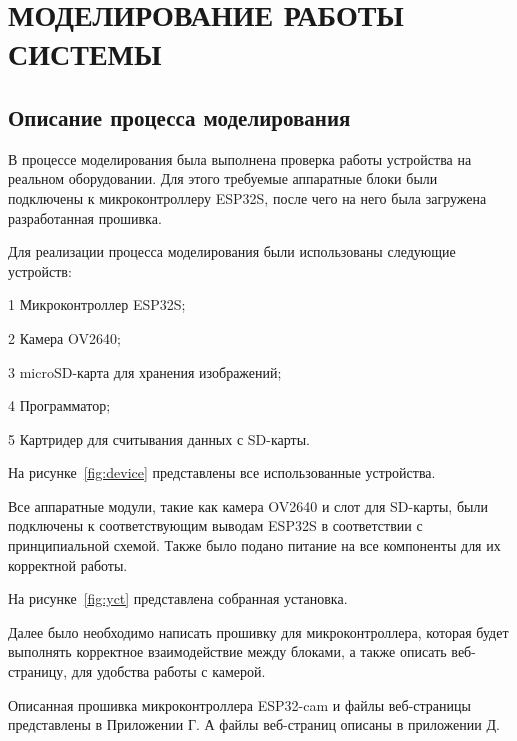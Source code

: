 \chapter[Моделирование работы системы]
{МОДЕЛИРОВАНИЕ РАБОТЫ СИСТЕМЫ}

\section{Описание процесса моделирования}
\hspace*{12.5 mm}В процессе моделирования была выполнена проверка работы устройства 
на реальном оборудовании. Для этого требуемые аппаратные блоки 
были подключены к микроконтроллеру ESP32S, после чего на него была загружена разработанная прошивка.

    Для реализации процесса моделирования были использованы
следующие устройств:

    1 Микроконтроллер ESP32S;

    2 Камера OV2640;

    3 microSD-карта для хранения изображений;

    4 Программатор;

    5 Картридер для считывания данных с SD-карты.

    На рисунке~\ref{fig:device} представлены все использованные устройства.


    Все аппаратные модули, такие как 
камера OV2640 и слот для SD-карты, были подключены к 
соответствующим выводам ESP32S в соответствии с принципиальной 
схемой. Также было подано питание на все компоненты для их 
корректной работы.

На рисунке~\ref{fig:yct} представлена собранная установка.


    Далее было необходимо написать прошивку для микроконтроллера,
которая будет выполнять корректное взаимодействие между блоками,
а также описать веб-страницу\cite{ESP-CAM}, для удобства работы с камерой.

    Описанная прошивка микроконтроллера ESP32-cam и файлы веб-страницы
представлены в Приложении Г. А файлы веб-страниц описаны в приложении Д.

